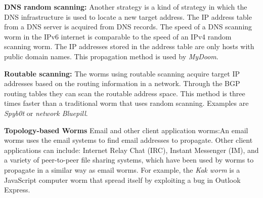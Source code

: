 \begin{description}
\item \textbf{DNS random scanning:} Another strategy is a kind of strategy in which the DNS infrastructure is used to locate a new target address. The IP address table from a DNS server is acquired from DNS records. 
The speed of a DNS scanning worm in the IPv6 internet is comparable to the speed of an IPv4 random scanning worm. 
The IP addresses stored in the address table are only hosts with public domain names. This propagation method is used by \textit{MyDoom}.

\item \textbf{Routable scanning:} The worms using routable scanning acquire target IP addresses based on the routing information in a network. Through  the BGP routing tables they can scan the routable address space. This method is three times faster than a traditional worm that uses random scanning. Examples are \textit{Spyb0t} or \textit{network Bluepill}. 

\item \textbf{Topology-based Worms} Email and other client application worms:An email worms uses the email systems to find email addresses to propagate. Other client applications can include: Internet Relay Chat (IRC), Instant Messenger (IM), and a variety of peer-to-peer
file sharing systems, which have been used by worms to propagate in a similar way as email worms. For example, the \textit{Kak worm} is a JavaScript computer worm that spread itself by exploiting a bug in Outlook Express. %


\end{description}
